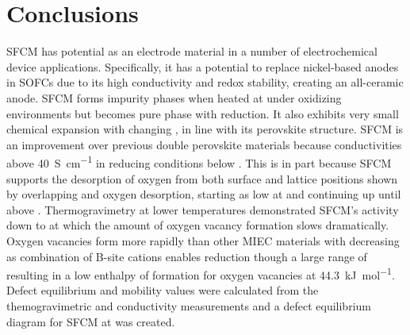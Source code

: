 \section{Conclusions}
    SFCM has potential as an electrode material in a number of electrochemical device applications.
    Specifically, it has a potential to replace nickel-based anodes in SOFCs due to its high conductivity and redox stability, creating an all-ceramic anode.
    SFCM forms impurity phases when heated at  under oxidizing environments but becomes pure phase with reduction.
    It also exhibits very small chemical expansion with changing , in line with its perovskite structure.
    SFCM is an improvement over previous double perovskite materials because conductivities above \SI{40}{S\per\centi\meter} in reducing conditions below .
    This is in part because SFCM supports the desorption of oxygen from both surface and lattice positions shown by overlapping \textalpha{} and \textbeta{} oxygen desorption, starting as low at  and continuing up until above .
    Thermogravimetry at lower temperatures demonstrated SFCM's activity down to  at which the amount of oxygen vacancy formation slows dramatically.
    Oxygen vacancies form more rapidly than other MIEC materials with decreasing  as combination of B-site cations enables reduction though a large range of  resulting in a low enthalpy of formation for oxygen vacancies at  \SI{44.3}{\kilo\joule\per\mol}.
    Defect equilibrium and mobility values were calculated from the themogravimetric and conductivity measurements and a defect equilibrium diagram for SFCM at  was created.

